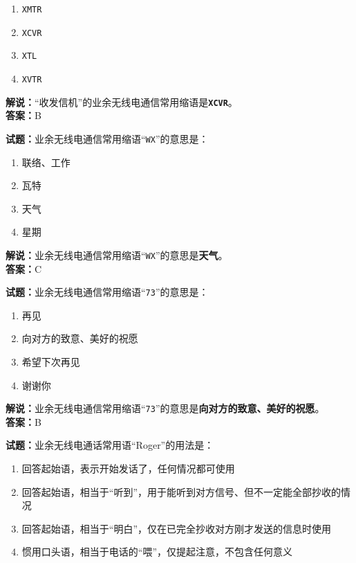 \documentclass{ctexbook}
\begin{document}
\begin{enumerate}[leftmargin=3em]
  \item \texttt{XMTR}
  \item \texttt{XCVR}
  \item \texttt{XTL}
  \item \texttt{XVTR}
\end{enumerate}

\noindent\textbf{解说：}“收发信机”的业余无线电通信常用缩语是\texttt{\textbf{XCVR}}。\\\noindent\textbf{答案：}B

\bigskip

\noindent\textbf{试题：}业余无线电通信常用缩语“\texttt{WX}”的意思是：

\begin{enumerate}[leftmargin=3em]
  \item 联络、工作
  \item 瓦特
  \item 天气
  \item 星期
\end{enumerate}

\noindent\textbf{解说：}业余无线电通信常用缩语“\texttt{WX}”的意思是\textbf{天气}。\\\noindent\textbf{答案：}C

\bigskip

\noindent\textbf{试题：}业余无线电通信常用缩语“\texttt{73}”的意思是：

\begin{enumerate}[leftmargin=3em]
  \item 再见
  \item 向对方的致意、美好的祝愿
  \item 希望下次再见
  \item 谢谢你
\end{enumerate}

\noindent\textbf{解说：}业余无线电通信常用缩语“\texttt{73}”的意思是\textbf{向对方的致意、美好的祝愿}。\\\noindent\textbf{答案：}B

\bigskip

\noindent\textbf{试题：}业余无线电通话常用语“Roger”的用法是：

\begin{enumerate}[leftmargin=3em]
  \item 回答起始语，表示开始发话了，任何情况都可使用
  \item 回答起始语，相当于“听到”，用于能听到对方信号、但不一定能全部抄收的情况
  \item 回答起始语，相当于“明白”，仅在已完全抄收对方刚才发送的信息时使用
  \item 惯用口头语，相当于电话的“喂”，仅提起注意，不包含任何意义
\end{enumerate}
\end{document}
